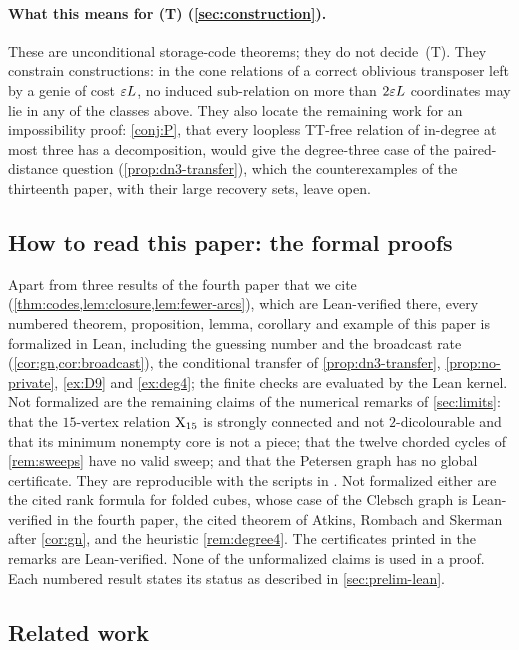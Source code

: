 \paragraph{What this means for (T) (\cref{sec:construction}).} These are unconditional storage-code theorems; they do not
decide~(T). They constrain constructions: in the cone relations of a correct oblivious transposer left by
a genie of cost $\varepsilon L$, no induced sub-relation on more than $2\varepsilon L$ coordinates may lie in any of the classes above.
They also locate the remaining work for an impossibility proof: \cref{conj:P}, that every loopless TT-free relation of in-degree at most three has a decomposition,
would give the degree-three case of the paired-distance question (\cref{prop:dn3-transfer}), which the counterexamples of
the thirteenth paper, with their large recovery sets, leave open.

\subsection{How to read this paper: the formal proofs}

Apart from three results of the fourth paper that we cite (\cref{thm:codes,lem:closure,lem:fewer-arcs}), which are
Lean-verified there, every numbered theorem, proposition, lemma, corollary and example of this paper is formalized in
Lean, including the guessing number and the broadcast rate (\cref{cor:gn,cor:broadcast}), the conditional transfer of
\cref{prop:dn3-transfer}, \cref{prop:no-private}, \cref{ex:D9} and \cref{ex:deg4}; the finite checks are evaluated by the
Lean kernel.
Not formalized are the remaining claims of the numerical remarks of \cref{sec:limits}: that the $15$-vertex relation
$\mathrm{X}_{15}$ is strongly connected and not $2$-dicolourable and that its minimum nonempty core is not a piece; that the twelve
chorded cycles of \cref{rem:sweeps} have no valid sweep; and that the Petersen graph has no global certificate. They are
reproducible with the scripts in . Not formalized either are the cited rank formula for folded cubes,
whose case of the Clebsch graph is Lean-verified in the fourth paper, the cited theorem of Atkins, Rombach and Skerman
after \cref{cor:gn}, and the heuristic \cref{rem:degree4}. The certificates printed in the remarks are Lean-verified.
None of the unformalized claims is used in a proof. Each numbered result states its status as described in \cref{sec:prelim-lean}.

\subsection{Related work}

